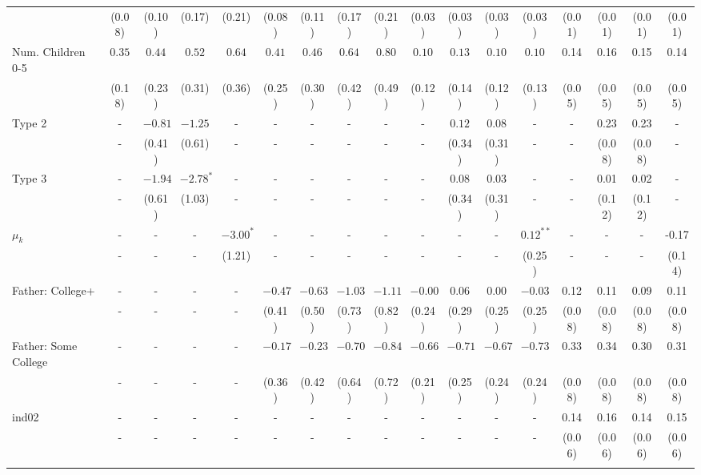 \begin{tabular}{lcccccccccccccccc}
&(0.08)&(0.10)&(0.17)&(0.21)&(0.08)&(0.11)&(0.17)&(0.21)&(0.03)&(0.03)&(0.03)&(0.03)&(0.01)&(0.01)&(0.01)&(0.01)\\
Num. Children 0-5&$0.35$&$0.44$&$0.52$&$0.64$&$0.41$&$0.46$&$0.64$&$0.80$&$0.10$&$0.13$&$0.10$&$0.10$&0.14&0.16&0.15&0.14\\
&(0.18)&(0.23)&(0.31)&(0.36)&(0.25)&(0.30)&(0.42)&(0.49)&(0.12)&(0.14)&(0.12)&(0.13)&(0.05)&(0.05)&(0.05)&(0.05)\\
Type 2&-&$-0.81$&$-1.25$&-&-&-&-&-&-&$0.12$&$0.08$&-&-&0.23&0.23&-\\
&-&(0.41)&(0.61)&-&-&-&-&-&-&(0.34)&(0.31)&-&-&(0.08)&(0.08)&-\\
Type 3&-&$-1.94$&$-2.78^{*}$&-&-&-&-&-&-&$0.08$&$0.03$&-&-&0.01&0.02&-\\
&-&(0.61)&(1.03)&-&-&-&-&-&-&(0.34)&(0.31)&-&-&(0.12)&(0.12)&-\\
$\mu_{k}$&-&-&-&$-3.00^{*}$&-&-&-&-&-&-&-&$0.12^{**}$&-&-&-&-0.17\\
&-&-&-&(1.21)&-&-&-&-&-&-&-&(0.25)&-&-&-&(0.14)\\
Father: College+&-&-&-&-&$-0.47$&$-0.63$&$-1.03$&$-1.11$&$-0.00$&$0.06$&$0.00$&$-0.03$&0.12&0.11&0.09&0.11\\
&-&-&-&-&(0.41)&(0.50)&(0.73)&(0.82)&(0.24)&(0.29)&(0.25)&(0.25)&(0.08)&(0.08)&(0.08)&(0.08)\\
Father: Some College&-&-&-&-&$-0.17$&$-0.23$&$-0.70$&$-0.84$&$-0.66$&$-0.71$&$-0.67$&$-0.73$&0.33&0.34&0.30&0.31\\
&-&-&-&-&(0.36)&(0.42)&(0.64)&(0.72)&(0.21)&(0.25)&(0.24)&(0.24)&(0.08)&(0.08)&(0.08)&(0.08)\\
ind02&-&-&-&-&-&-&-&-&-&-&-&-&0.14&0.16&0.14&0.15\\
&-&-&-&-&-&-&-&-&-&-&-&-&(0.06)&(0.06)&(0.06)&(0.06)\\
\\
\bottomrule\end{tabular}